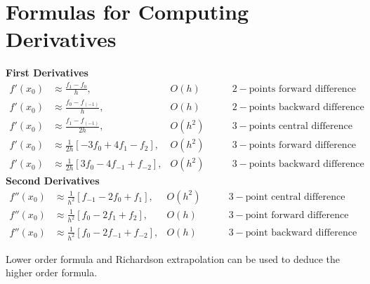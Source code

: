 \documentclass[12pt,class=book,crop=false]{standalone}
\begin{document}
\section{Formulas for Computing Derivatives}
\textbf{First Derivatives}
\begin{align*}
    f' (x_0) & \approx \frac{f_1-f_0}{h},                  & O(h)\qquad    & 2-\text{points forward difference}  \\
    f' (x_0) & \approx\frac{f_0-f_(-1)}{h},                & O(h)\qquad    & 2-\text{points backward difference} \\
    f' (x_0) & \approx\frac{f_1-f_(-1)}{2h},               & O(h^2)\qquad  & 3-\text{points central difference}  \\
    f' (x_0) & \approx\frac{1}{2h} [-3f_0+4f_1-f_2 ],      & O(h^2)\qquad  & 3-\text{points forward difference}  \\
    f' (x_0) & \approx\frac{1}{2h} [3f_0-4f_{-1}+f_{-2} ], & O(h^2) \qquad & 3-\text{points backward difference}
\end{align*}
\textbf{Second Derivatives}
\begin{align*}
    f''(x_0) & \approx  \frac{1}{h^2}  [f_{-1}-2f_0+f_1 ],  & O(h^2)\qquad & 3-\text{point central difference}  \\
    f''(x_0) & \approx\frac{1}{h^2}  [f_0-2f_1+f_2 ],       & O(h)\qquad   & 3-\text{point forward difference}  \\
    f''(x_0) & \approx\frac{1}{h^2}  [f_0-2f_{-1}+f_{-2} ], & O(h)\qquad   & 3-\text{point backward difference}
\end{align*}

Lower order formula and Richardson extrapolation can be used to deduce the higher order formula.
\end{document}
